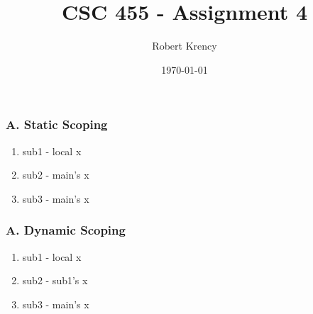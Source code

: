 \documentclass[12pt]{article}
\title{CSC 455 - Assignment 4}
\author{Robert Krency}
\date{\today}
\begin{document}
\maketitle

\subsubsection*{A. Static Scoping}

\begin{enumerate}
    \item sub1 - local x
    \item sub2 - main's x
    \item sub3 - main's x
\end{enumerate}

\subsubsection*{A. Dynamic Scoping}

\begin{enumerate}
    \item sub1 - local x
    \item sub2 - sub1's x
    \item sub3 - main's x
\end{enumerate}
\end{document}
